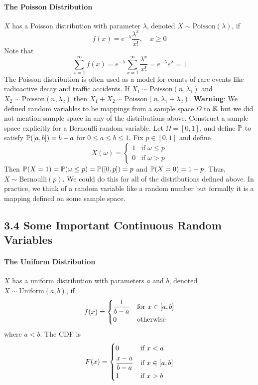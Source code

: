 \paragraph{The Poisson Distribution}\label{the-poisson-distribution}
\(X\) has a Poisson distribution with parameter \(\lambda\), denoted \(X \sim \text{Poisson}(\lambda)\), if
\[
f(x) = e^{-\lambda} \frac{\lambda^x}{x!}, \quad x \geq 0
\]
Note that
\[
\sum_{x=1}^{\infty} f(x) 
= e^{-\lambda} \sum_{x=1}^{\infty} \frac{\lambda^x}{x!} 
= e^{-\lambda} e^\lambda = 1
\]
The Poisson distribution is often used as a model for counts of rare events like radioactive decay and traffic accidents. If \(X_{1} \sim \text{Poisson}(n, \lambda_{1})\) and \(X_{2} \sim \text{Poisson}(n, \lambda_{2})\) then \(X_{1} + X_{2} \sim \text{Poisson}(n, \lambda_{1} + \lambda_{2})\).
\textbf{Warning}: We defined random variables to be mappings from a sample space \(\Omega\) to \(\mathbb{R}\) but we did not mention sample space in any of the distributions above. Construct a sample space explicitly for a Bernoulli random variable. Let \(\Omega = [0, 1]\), and define \(\operatorname{\mathbb{P}}\) to satisfy \(\operatorname{\mathbb{P}}([a, b]) = b - a\) for \(0 \leq a \leq b \leq 1\). Fix \(p \in [0, 1]\) and define
\[
X(\omega) = 
\begin{cases}
1 &\text{if }\omega \leq p 
\\
0 &\text{if }\omega > p
\end{cases}
\]
Then \(\operatorname{\mathbb{P}}(X = 1) = \operatorname{\mathbb{P}}(\omega \leq p) = \operatorname{\mathbb{P}}([0, p]) = p\) and \(\operatorname{\mathbb{P}}(X = 0) = 1 - p\). Thus, \(X \sim \text{Bernoulli}(p)\). We could do this for all of the distributions defined above. In practice, we think of a random variable like a random number but formally it is a mapping defined on some sample space.

\subsection*{3.4 Some Important Continuous Random Variables}\label{some-important-continuous-random-variables}
\paragraph{The Uniform Distribution}\label{the-uniform-distribution}
\(X\) has a uniform distribution with parameters \(a\) and \(b\), denoted \(X \sim \text{Uniform}(a, b)\), if
\[
f(x) = 
\begin{cases}
\displaystyle\frac{1}{b - a} &\text{for } x \in [a, b]
\\[
1ex]
0 &\text{otherwise}
\end{cases}
\]
where \(a < b\). The CDF is
\[
F(x) = 
\begin{cases}
0 &\text{if } x < a 
\\[
1ex]
\displaystyle\frac{x - a}{b - a} &\text{if } x \in [a, b] 
\\[
1ex]
1 &\text{if } x > b
\end{cases}
\]

